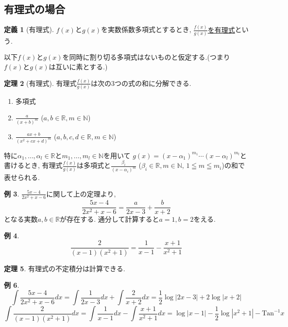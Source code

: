 \documentclass[dvipdfmx,a4paper,11pt]{article}
\newcommand{\R}{\mathbb{R}}
\newcommand{\N}{\mathbb{N}}
\newcommand{\Tan}{\text{Tan}^{-1}}
\theoremstyle{definition}
\newtheorem{thm}{定理}
\newtheorem{dfn}[thm]{定義}
\newtheorem{exa}[thm]{例}
\begin{document}
\subsection{有理式の場合}
 
\begin{tcolorbox}[
    colback = white,
    colframe = green!35!black,
    fonttitle = \bfseries,
    breakable = true]
    \begin{dfn}[有理式]
  $f(x)$と$g(x)$を実数係数多項式とするとき, \underline{$\frac{f(x)}{g(x)}$を有理式}という.
        \end{dfn}
    \end{tcolorbox}

以下$f(x)$と$g(x)$を同時に割り切る多項式はないものと仮定する.(つまり$f(x)$と$g(x)$は互いに素とする.)

\begin{tcolorbox}[
    colback = white,
    colframe = green!35!black,
    fonttitle = \bfseries,
    breakable = true]
    \begin{thm}[有理式]
有理式$\frac{f(x)}{g(x)}$は次の3つの式の和に分解できる.
\begin{enumerate}
\item 多項式
\item $\frac{a}{(x+b)^m}$ ($a,b \in \R, m\in \N$)
\item $\frac{ax + b}{(x^2 + cx +d)^m}$ ($a,b,c,d \in \R, m\in \N$)
\end{enumerate}
特に$\alpha_1, \ldots, \alpha_l \in \R$と$m_1, \ldots, m_l \in \N$を用いて
$g(x) = (x- \alpha_1)^{m_1} \cdots (x- \alpha_l)^{m_l} $と書けるとき, 
有理式$\frac{f(x)}{g(x)}$は多項式と$\frac{\beta_i}{(x- \alpha_i)^m}$ ($\beta_i \in \R, m\in \N$, $1 \leqq m\leqq m_i$)の和で表せられる.
        \end{thm}
    \end{tcolorbox}
\begin{exa}
$\frac{5x -4 }{2x^2 + x -6}$に関して上の定理より, 
$$
\frac{5x -4 }{2x^2 + x -6} = \frac{a}{2x-3} + \frac{b}{x+2}
$$
となる実数$a,b \in \R$が存在する.
通分して計算すると$a=1, b=2$をえる.

\end{exa}
\begin{exa}
$$
\frac{2}{(x-1)(x^2 + 1)} = \frac{1}{x-1} - \frac{x+1}{x^2 + 1}
$$
\end{exa}

\begin{tcolorbox}[
    colback = white,
    colframe = green!35!black,
    fonttitle = \bfseries,
    breakable = true]
    \begin{thm}
有理式の不定積分は計算できる.
        \end{thm}
    \end{tcolorbox}
\begin{exa}
$$
\int \frac{5x -4 }{2x^2 + x -6}dx = \int \frac{1}{2x-3} dx+ \int \frac{2}{x+2}dx
= \frac{1}{2}\log|2x-3| + 2 \log |x+2|
$$
$$
\int \frac{2}{(x-1)(x^2 + 1)} dx = \int \frac{1}{x-1}dx  - \int \frac{x+1}{x^2 + 1}dx
= \log|x-1| - \frac{1}{2} \log |x^2+1|- \Tan x
$$
\end{exa}
\end{document}
